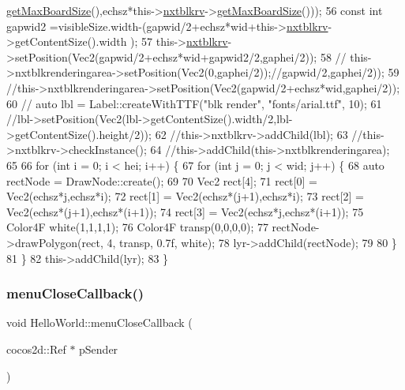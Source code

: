 \begin{DoxyCode}
      \hyperlink{class_tetris_1_1_views_1_1_next_block_render_behavior_aa1d5fbc45ec963fa86fff0f73359d028}{getMaxBoardSize}(),echsz*this->\hyperlink{class_hello_world_ac06ca16fc5a18d32c58e0229c24817f6}{nxtblkrv}->\hyperlink{class_tetris_1_1_views_1_1_next_block_render_behavior_aa1d5fbc45ec963fa86fff0f73359d028}{getMaxBoardSize}()));
56     \textcolor{keyword}{const} \textcolor{keywordtype}{int} gapwid2 =visibleSize.width-(gapwid/2+echsz*wid+this->\hyperlink{class_hello_world_ac06ca16fc5a18d32c58e0229c24817f6}{nxtblkrv}->getContentSize().width
      );
57     this->\hyperlink{class_hello_world_ac06ca16fc5a18d32c58e0229c24817f6}{nxtblkrv}->setPosition(Vec2(gapwid/2+echsz*wid+gapwid2/2,gaphei/2));
58   \textcolor{comment}{//  this->nxtblkrenderingarea->setPosition(Vec2(0,gaphei/2));//gapwid/2,gaphei/2));}
59     \textcolor{comment}{//this->nxtblkrenderingarea->setPosition(Vec2(gapwid/2+echsz*wid,gaphei/2));}
60    \textcolor{comment}{// auto lbl = Label::createWithTTF("blk render", "fonts/arial.ttf", 10);}
61     \textcolor{comment}{//lbl->setPosition(Vec2(lbl->getContentSize().width/2,lbl->getContentSize().height/2));}
62     \textcolor{comment}{//this->nxtblkrv->addChild(lbl);}
63     \textcolor{comment}{//this->nxtblkrv->checkInstance();}
64     \textcolor{comment}{//this->addChild(this->nxtblkrenderingarea);}
65     
66    \textcolor{keywordflow}{for} (\textcolor{keywordtype}{int} i = 0; i < hei; i++) \{
67         \textcolor{keywordflow}{for} (\textcolor{keywordtype}{int} j = 0; j < wid; j++) \{
68             \textcolor{keyword}{auto} rectNode = DrawNode::create();
69         
70             Vec2 rect[4];
71             rect[0] = Vec2(echsz*j,echsz*i);
72             rect[1] = Vec2(echsz*(j+1),echsz*i);
73             rect[2] = Vec2(echsz*(j+1),echsz*(i+1));
74             rect[3] = Vec2(echsz*j,echsz*(i+1));
75             Color4F white(1,1,1,1);
76             Color4F transp(0,0,0,0);
77             rectNode->drawPolygon(rect, 4, transp, 0.7f, white);
78             lyr->addChild(rectNode);
79 
80         \}
81     \}
82     this->addChild(lyr);
83 \}
\end{DoxyCode}
\mbox{\label{class_hello_world_ac4ab2f5e922e659d4f137591c0f6a9b0}} 
\subsubsection{\texorpdfstring{menu\+Close\+Callback()}{menuCloseCallback()}}
{\footnotesize\ttfamily void Hello\+World\+::menu\+Close\+Callback (\begin{DoxyParamCaption}\item[{cocos2d\+::\+Ref $\ast$}]{p\+Sender }\end{DoxyParamCaption})}



